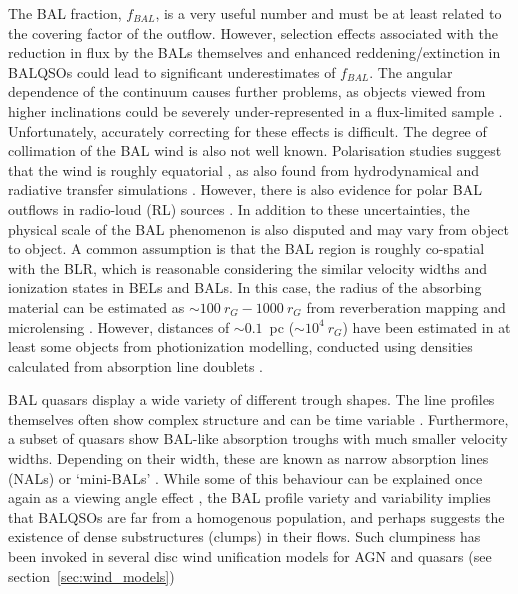 The BAL fraction, $f_{BAL}$, is a very useful number and must be at least
related to the covering factor of the outflow. However, selection effects associated
with the reduction in flux by the BALs themselves \citep{knigge2008} and enhanced 
reddening/extinction in BALQSOs \citep{reichard2003,allen2011}
could lead to significant underestimates of $f_{BAL}$. 
The angular dependence of the continuum causes further problems,
as objects viewed from higher inclinations could be severely under-represented in 
a flux-limited sample \citep{goodrich1997,krolikvoit1998}.
Unfortunately, accurately correcting for these effects is difficult. 
The degree of collimation of the BAL wind
is also not well known. Polarisation studies suggest that the 
wind is roughly equatorial \citep{goodrich1995, cohen1995}, 
as also found from hydrodynamical and radiative transfer simulations 
\citep{PSK2000,PK04, higginbottom2013, borguet2010}.
However, there is also evidence for polar BAL outflows in 
radio-loud (RL) sources \citep{zhou2006,ghoshpunsly2007}.
In addition to these uncertainties, the physical scale of the BAL
phenomenon is also disputed and may vary from object to object.
A common assumption is that the BAL region is roughly co-spatial with
the BLR, which is reasonable considering the similar velocity widths
and ionization states in BELs and BALs. In this case, 
the radius of the absorbing material
can be estimated as $\sim 100~r_G -1000~r_G$ from reverberation mapping
and microlensing \citep[e.g., for BLRs in BALQSOs,][]{sluse2015,odowd2015}.
However, distances of  $\sim0.1$~pc ($\sim 10^4~r_G$) 
have been estimated in at least some objects from photionization modelling, 
conducted using densities calculated from absorption line doublets
\citep{borguet2013,chamberlain2015}.

BAL quasars display a wide variety of different trough shapes. 
The line profiles themselves often show complex structure 
\citep{foltz1987,ganguly2006, simonhamann2010} and can be time variable 
\citep{hall2011, capellupo2011,capellupo2012,capellupo2014, filizak2012}. 
Furthermore, a subset of quasars show
BAL-like absorption troughs with much smaller velocity widths. Depending 
on their width, these are known as narrow absorption lines (NALs) or `mini-BALs'
\citep{misawa2007,misawa2008,nestor2008}.
While some of this behaviour can be explained once again as a viewing angle
effect \citep[e.g. ][]{ganguly2001}, the
BAL profile variety and variability implies that BALQSOs 
are far from a homogenous population, and perhaps suggests the existence of
dense substructures (clumps) in their flows. Such clumpiness has been invoked
in several disc wind unification models for AGN and quasars
(see section~\ref{sec:wind_models})

